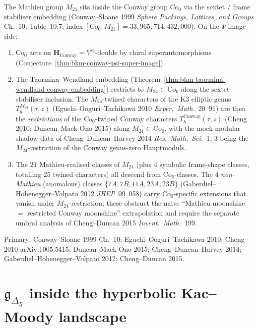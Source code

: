 \begin{remark}
\label{rem:bkm-conway-M24-descent}
The Mathieu group $M_{24}$ sits inside the Conway group
$\mathrm{Co}_0$ via the sextet / frame stabiliser embedding
(Conway--Sloane 1999 \emph{Sphere Packings, Lattices, and Groups}
Ch.~10, Table~10.7; index $[\mathrm{Co}_0 : M_{24}] =
33{,}965{,}714{,}432{,}000$). On the $\Psi$-image side:
\begin{enumerate}[label=\textup{(\roman*)}]
\item $\mathrm{Co}_0$ acts on $\mathbf{H}_{\mathrm{Conway}} =
V^{s\natural}\text{-double}$ by chiral superautomorphisms
(Conjecture~\ref{thm:bkm-conway-psi-super-image}).
\item The Taormina--Wendland embedding
(Theorem~\ref{thm:bkm-taormina-wendland-conway-embedding})
restricts to $M_{24}\subset\mathrm{Co}_0$ along the
sextet-stabiliser inclusion. The $M_{24}$-twined characters
of the K3 elliptic genus
$T_g^{M_{24}}(\tau,z)$ (Eguchi--Ooguri--Tachikawa 2010
\emph{Exper.\ Math.}~20~91) are then the
\emph{restrictions} of the $\mathrm{Co}_0$-twined
Conway characters
$T_h^{\mathrm{Conway}}(\tau,z)$ (Cheng 2010; Duncan--Mack-Ono
2015) along $M_{24}\subset\mathrm{Co}_0$, with the mock-modular
shadow data of Cheng--Duncan--Harvey 2014
\emph{Res.\ Math.\ Sci.}~1, 3 being the $M_{24}$-restriction of
the Conway genus-zero Hauptmoduls.
\item The $21$ Mathieu-realised classes of $M_{24}$ (plus $4$
symbolic frame-shape classes, totalling $25$ twined characters)
all descend from $\mathrm{Co}_0$-classes. The
$4$ \emph{non-Mathieu} (anomalous) classes $\{7A, 7B, 11A, 23A, 23B\}$
(Gaberdiel--Hohenegger--Volpato 2012 \emph{JHEP}~09~058) carry
$\mathrm{Co}_0$-specific extensions that vanish under $M_{24}$-restriction;
these obstruct the naive ``Mathieu moonshine $=$ restricted Conway
moonshine'' extrapolation and require the separate umbral
analysis of Cheng--Duncan 2015 \emph{Invent.\ Math.}~199.
\end{enumerate}
Primary: Conway--Sloane 1999 Ch.~10;
Eguchi--Ooguri--Tachikawa 2010;
Cheng 2010 arXiv:1005.5415;
Duncan--Mack-Ono 2015;
Cheng--Duncan--Harvey 2014;
Gaberdiel--Hohenegger--Volpato 2012;
Cheng--Duncan 2015.
\end{remark}

\section{\texorpdfstring{$\mathfrak{g}_{\Delta_5}$}{g-Delta-5} inside the hyperbolic Kac--Moody landscape}
\label{sec:bkm-hyperbolic-km-landscape}

